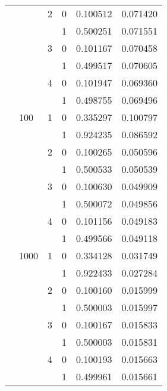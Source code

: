 \begin{tabular}{llllrr}
   &      & 2 & 0 &        0.100512 &           0.071420 \\
   &      &   & 1 &        0.500251 &           0.071551 \\
   &      & 3 & 0 &        0.101167 &           0.070458 \\
   &      &   & 1 &        0.499517 &           0.070605 \\
   &      & 4 & 0 &        0.101947 &           0.069360 \\
   &      &   & 1 &        0.498755 &           0.069496 \\
   & 100  & 1 & 0 &        0.335297 &           0.100797 \\
   &      &   & 1 &        0.924235 &           0.086592 \\
   &      & 2 & 0 &        0.100265 &           0.050596 \\
   &      &   & 1 &        0.500533 &           0.050539 \\
   &      & 3 & 0 &        0.100630 &           0.049909 \\
   &      &   & 1 &        0.500072 &           0.049856 \\
   &      & 4 & 0 &        0.101156 &           0.049183 \\
   &      &   & 1 &        0.499566 &           0.049118 \\
   & 1000 & 1 & 0 &        0.334128 &           0.031749 \\
   &      &   & 1 &        0.922433 &           0.027284 \\
   &      & 2 & 0 &        0.100160 &           0.015999 \\
   &      &   & 1 &        0.500003 &           0.015997 \\
   &      & 3 & 0 &        0.100167 &           0.015833 \\
   &      &   & 1 &        0.500003 &           0.015831 \\
   &      & 4 & 0 &        0.100193 &           0.015663 \\
   &      &   & 1 &        0.499961 &           0.015661 \\
\bottomrule
\end{tabular}
